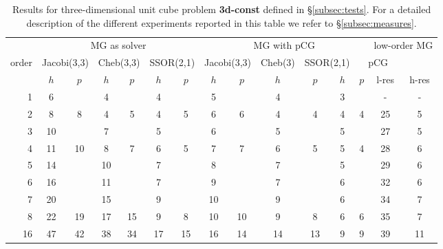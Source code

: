 \documentclass[smallcondensed,final]{svjour3}     %
\begin{document}
\begin{table}
  \caption{\label{tab:3d-box} Results for three-dimensional unit cube
    problem  {\bf 3d-const} defined in \S\ref{subsec:tests}. For a
    detailed description of the different experiments reported in this
    table we refer to \S\ref{subsec:measures}.}  \centering
	  \begin{tabular}{|r|c c|c c|c c||c c|c c|c c||c c|} 
	    \hline
	    & \multicolumn{6}{c||}{MG as solver} &
            \multicolumn{6}{c||}{MG with pCG} &
            \multicolumn{2}{r|}{\!\!low-order MG\!\!} \\
	    \cline{2-13}
	    \!\!\! order \!\!\!\! &  \multicolumn{2}{c|}{\!\!\scriptsize  Jacobi(3,3)\!\!} &  \multicolumn{2}{c|}{\!\!\scriptsize Cheb(3,3)\!\!} & \multicolumn{2}{c||}{\!\!\scriptsize  SSOR(2,1)\!\!} & \multicolumn{2}{c|}{\!\!\scriptsize Jacobi(3,3)\!\!} &  \multicolumn{2,1}{c|}{\!\!\scriptsize Cheb(3)\!\!} & \multicolumn{2}{c||}{\!\!\scriptsize SSOR(2,1)\!\!} & \multicolumn{2}{c|}{pCG}\\
	\hline
	 & $h$ & $p$ & $h$ & $p$& $h$ & $p$& $h$ & $p$& $h$ & $p$& $h$ & $p$& l-res  & h-res\\
	 \cline{2-15}
1 & 6 & & 4 & & 4 & & 5 & & 4 & & 3 & & -  & - \\
2 & 8 & 8 & 4 & 5 & 4 & 5 & 6 & 6 & 4 & 4 & 4 & 4 &  25 &  5 \\
3 & 10 & & 7 & & 5 & & 6 & & 5 & & 5 & & 27 &  5  \\
4 & 11 & 10 & 8 & 7 & 6 & 5 & 7 & 7 & 6 & 5 & 5 & 4 & 28 & 6 \\
5 & 14 & & 10 & & 7 & & 8 & & 7 & & 5 & & 29  & 6 \\
6 & 16 & & 11 & & 7 & & 9 & & 7 & & 6 & & 32  & 6 \\
7 & 20 & & 15 & & 9 & & 10 & & 9 & & 6 & & 34 & 7 \\
8 & 22 & 19 & 17 & 15 & 9 & 8 & 10 & 10 & 9 & 8 & 6 & 6 & 35 & 7 \\
16 & 47 & 42 & 38 & 34 & 17 & 15 & 16 & 14 & 14 & 13 & 9 & 9 & 39 & 11 \\
\hline 
 \end{tabular}
\end{table}
\end{document}
